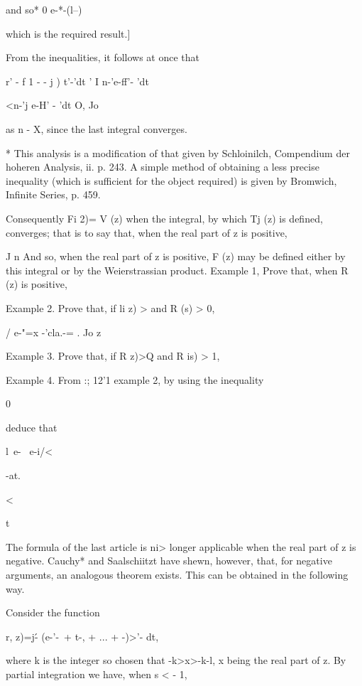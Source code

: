 and so* 0 e-*-(l--) %

which is the required result.]

From the inequalities, it follows at once that

r' - f 1 - - j ) t'-'dt ' I n-'e-ff'- 'dt

<n-'j e-H' - 'dt O, Jo

as n - X, since the last integral converges.

* This analysis is a modification of that given by Schloinilch,
Compendium der hoheren Analysis, ii. p. 243. A simple method of
obtaining a less precise inequality (which is sufficient for the
object required) is given by Bromwich, Infinite Series, p. 459.

%
%

Consequently Fi 2)= V (z) when the integral, by which Tj (z) is
defined, converges; that is to say that, when the real part of z is
positive,

J n And so, when the real part of z is positive, F (z) may be defined
either by this integral or by the Weierstrassian product. Example 1,
Prove that, when R (z) is positive,

Example 2. Prove that, if li z) > and R (s) > 0,

/ e-"=x -'cla.-= . Jo z

Example 3. Prove that, if R z)>Q and R is) > 1,

Example 4. From :; 12'1 example 2, by using the inequality

0%

deduce that

l\ e- \ e-i/<

-at.

<

t


The formula of the last article is ni> longer applicable when the real
part of z is negative. Cauchy* and Saalschiitzt have shewn, however,
that, for negative arguments, an analogous theorem exists. This can be
obtained in the following way.

Consider the function

r, z)=j\'- (e-'-\ + t-, + ... + -)>'- dt,

where k is the integer so chosen that -k>x>-k-l, x being the real part
of z. By partial integration we have, when s < - 1,

